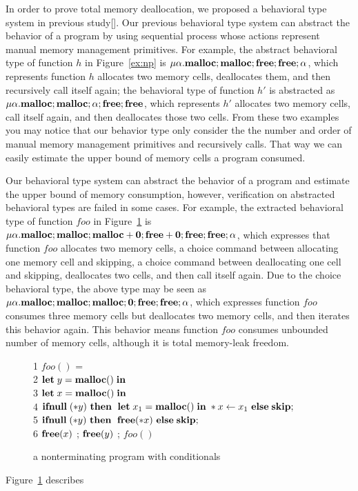 In order to prove total memory deallocation, we proposed a behavioral
type system in previous study[]. Our previous behavioral type system
can abstract the behavior of a program by using sequential process
whose actions represent manual memory management primitives. For
example, the abstract behavioral type of function \(h\) in
Figure~\ref{ex:np} is
\(\mu\alpha.\mathbf{malloc};\mathbf{malloc};\mathbf{free};\mathbf{free};\alpha\), which represents
function \(h\) allocates two memory cells, deallocates them, and then
recursively call itself again; the behavioral type of function \(h'\)
is abstracted as \(\mu\alpha.\mathbf{malloc};\mathbf{malloc};\alpha;\mathbf{free};\mathbf{free}\),
which represents \(h'\) allocates two memory cells, call itself again,
and then deallocates those two cells. From these two examples you may
notice that our behavior type only consider the the number and order
of manual memory management primitives and recursively calls. That way
we can easily estimate the upper bound of memory cells a program
consumed.

Our behavioral type system can abstract the behavior of a program and
estimate the upper bound of memory consumption, however, verification
on abstracted behavioral types are failed in some cases. For example,
the extracted behavioral type of function \(foo\) in
Figure~\ref{ex:np2} is \( \mu\alpha.\mathbf{malloc};\mathbf{malloc};\mathbf{malloc}
+ \mathbf{0};\mathbf{free} + \mathbf{0};\mathbf{free};\mathbf{free};\alpha \), which expresses that
function \(foo\) allocates two memory cells, a choice command between
allocating one memory cell and skipping, a choice command between
deallocating one cell and skipping, deallocates two cells, and then
call itself again. Due to the choice behavioral type, the above type
may be seen as \(
\mu\alpha.\mathbf{malloc};\mathbf{malloc};\mathbf{malloc};\mathbf{0};\mathbf{free};\mathbf{free};\alpha \), which
expresses function \(foo\) consumes three memory cells but deallocates
two memory cells, and then iterates this behavior again. This behavior
means function \(foo\) consumes unbounded number of memory cells,
although it is total memory-leak freedom.

\begin{exmp}\label{ex:ex2}
\begin{figure}[h]
1  \dtb $foo()$ =  \\
2    \dtb \dtb  $\mathbf{let}\; y = \mathbf{malloc()}\; \mathbf{in}\; $ \\
3    \dtb \dtb  $\mathbf{let}\; x = \mathbf{malloc()}\; \mathbf{in}\; $\\
4    \dtb \dtb  $\mathbf{ifnull}\;(*y) \ \mathbf{then}\; \ \mathbf{let}\; x_1 = \mathbf{malloc()}\; \mathbf{in}\;  *x \leftarrow x_1 \ \mathbf{else}\; \mathbf{skip} ;$ \\
5   \dtb \dtb   $\mathbf{ifnull}\;(*y) \ \mathbf{then}\; \ \mathbf{free}(*x) \ \mathbf{else}\; \mathbf{skip} ;$ \\
6   \dtb \dtb   $\mathbf{free}(x)$ ; $\mathbf{free}(y)$ ; $foo()$
\caption{a nonterminating program with conditionals}
\label{ex:np2}
\end{figure}
Figure~\ref{ex:np2} describes 
\end{exmp}

